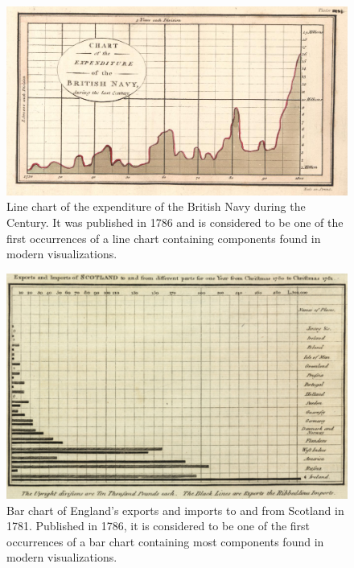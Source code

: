 \begin{figure}[tp]
\centering
\includegraphics[keepaspectratio,width=\linewidth,height=\thirdh]
{images/playfair-line-chart.png}
\caption[Line Chart by William Playfair from 1786]{%
Line chart of the expenditure of the British Navy during the 
Century. It was published in 1786 and is considered to be one of the
first occurrences of a line chart containing components found in
modern visualizations.
}
\label{fig:PlayfairLineChart}
\end{figure}



\begin{figure}[tp]
\centering
\includegraphics[keepaspectratio,width=\linewidth,height=\thirdh]
{images/playfair-bar-chart.png}
\caption[Bar Chart by William Playfair from 1786]{%
Bar chart of England's exports and imports to and from Scotland in
1781. Published in 1786, it is considered to be one of the
first occurrences of a bar chart containing most components found in
modern visualizations.
}
\label{fig:PlayfairBarChart}
\end{figure}



